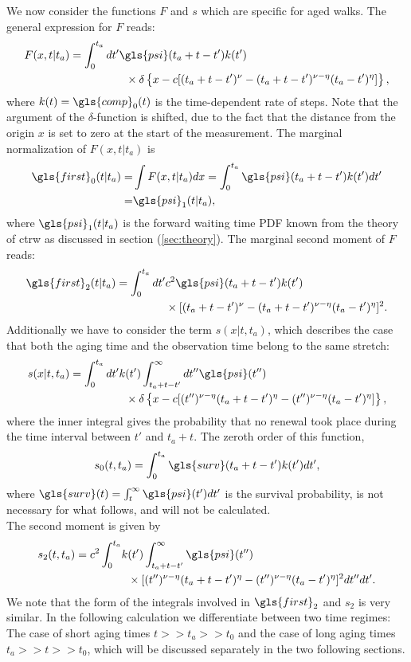 We now consider the functions $F$ and $s$ which are specific for aged walks. The general expression for $F$ reads: 
\begin{align}
 F(x,t|t_a)= \int_0^{t_a} dt' & \gls{psi}(t_a+t-t') k(t') \\
& \;\; \times \delta \left\{x-c[(t_a+t-t')^\nu-(t_a+t-t')^{\nu-\eta} (t_a-t')^\eta]\right\} , \nonumber
\end{align}
where $k(t)=\gls{comp}_{0}(t)$ is the time-dependent rate of steps. Note that the argument of the $\delta$-function is shifted, 
due to the fact that the distance from the origin $x$ is set to zero at the start of the measurement.
The marginal normalization of $F(x,t|t_a)$ is
\begin{align}
\gls{first}_0(t|t_a) =& \int F(x,t|t_a) dx =\int_0^{t_a} \gls{psi}(t_a+t-t') k(t') dt' \nonumber \\
 =& \gls{psi}_1(t|t_a),
\end{align}
where $\gls{psi}_1(t|t_a)$ is the forward waiting time PDF known from the theory of \gls{ctrw} as discussed in section (\ref{sec:theory}). The marginal second moment of $F$ reads:
\begin{align}
\gls{first}_2(t|t_a) = \int_0^{t_a} dt' & c^2 \gls{psi}(t_a+t-t') k(t')  \label{eqn:F2} \\ 
& \times [(t_a+t-t')^\nu-(t_a+t-t')^{\nu-\eta} (t_a-t')^\eta]^2 . \nonumber
\end{align}
Additionally we have to consider the term $s(x|t,t_a)$, which describes the case that both the aging time and the observation time belong to the same stretch:
\begin{align}
 s(x|t,t_a) = \int_0^{t_a} dt' & k(t') \int^{\infty}_{t_a+t-t'} dt'' \gls{psi}(t'')  \\
& \;\; \times \delta \left\{x-c[(t'')^{\nu-\eta}(t_a+t-t')^\eta-(t'')^{\nu-\eta}(t_a-t')^{\eta}]\right\} , \nonumber 
\end{align}
where the inner integral gives the probability that no renewal took place during the time interval between $t'$ and $t_a+t$. The zeroth order of this function,
\begin{equation}
 s_0(t,t_a) = \int_0^{t_a} \gls{surv}(t_a+t-t') k(t') dt'  ,
\end{equation}
where $\gls{surv}(t) = \int_t^\infty \gls{psi}(t') dt'$ is the survival probability,
is not necessary for what follows, and will not be calculated. \\
The second moment is given by
\begin{align}
\begin{split}
 s_2(t,t_a) =c^2 \int_0^{t_a} & k(t') \int^{\infty}_{t_a+t-t'}  \gls{psi}(t'')  \\ 
& \;\; \times [(t'')^{\nu-\eta}(t_a+t-t')^\eta-(t'')^{\nu-\eta}(t_a-t')^{\eta}]^2   dt'' dt'  \label{eqn:s2} .
\end{split}
\end{align}
We note that the form of the integrals involved in $\gls{first}_2$ and $s_2$ is very similar. 
In the following calculation we differentiate between two time regimes: The case of short aging times $t>>t_a>> t_0$ and the case of long aging times $t_a>>t>>t_0$, 
which will be discussed separately in the two following sections. 


